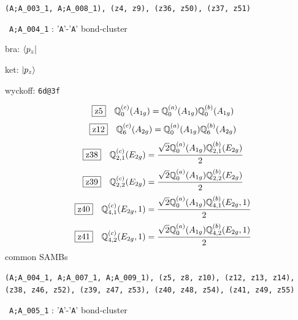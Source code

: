\documentclass[fleqn,10pt,landscape]{jsarticle}
\begin{document}
\noindent\texttt{(A;A_003_1, A;A_008_1), (z4, z9), (z36, z50), (z37, z51)}
\vspace{5mm}

\noindent\textbullet\, \texttt{A;A_004_1} : '\texttt{A}'-'\texttt{A}' bond-cluster

\noindent\quad * bra: $\bra{p_{z}}$

\noindent\quad * ket: $\ket{p_{z}}$

\noindent\quad * wyckoff: \texttt{6d@3f}

\begin{dmath*}
\hspace*{3mm}\fbox{z5}\quad \mathbb{Q}_{0}^{(c)}(A_{1g})=\mathbb{Q}_{0}^{(a)}(A_{1g}) \mathbb{Q}_{0}^{(b)}(A_{1g})
\end{dmath*}
\begin{dmath*}
\hspace*{3mm}\fbox{z12}\quad \mathbb{Q}_{6}^{(c)}(A_{2g})=\mathbb{Q}_{0}^{(a)}(A_{1g}) \mathbb{Q}_{6}^{(b)}(A_{2g})
\end{dmath*}
\begin{dmath*}
\hspace*{3mm}\fbox{z38}\quad \mathbb{Q}_{2,1}^{(c)}(E_{2g})=\frac{\sqrt{2} \mathbb{Q}_{0}^{(a)}(A_{1g}) \mathbb{Q}_{2,1}^{(b)}(E_{2g})}{2}
\end{dmath*}
\begin{dmath*}
\hspace*{3mm}\fbox{z39}\quad \mathbb{Q}_{2,2}^{(c)}(E_{2g})=\frac{\sqrt{2} \mathbb{Q}_{0}^{(a)}(A_{1g}) \mathbb{Q}_{2,2}^{(b)}(E_{2g})}{2}
\end{dmath*}
\begin{dmath*}
\hspace*{3mm}\fbox{z40}\quad \mathbb{Q}_{4,1}^{(c)}(E_{2g},1)=\frac{\sqrt{2} \mathbb{Q}_{0}^{(a)}(A_{1g}) \mathbb{Q}_{4,1}^{(b)}(E_{2g},1)}{2}
\end{dmath*}
\begin{dmath*}
\hspace*{3mm}\fbox{z41}\quad \mathbb{Q}_{4,2}^{(c)}(E_{2g},1)=\frac{\sqrt{2} \mathbb{Q}_{0}^{(a)}(A_{1g}) \mathbb{Q}_{4,2}^{(b)}(E_{2g},1)}{2}
\end{dmath*}
\noindent * common SAMBs

\noindent\texttt{(A;A_004_1, A;A_007_1, A;A_009_1), (z5, z8, z10), (z12, z13, z14), (z38, z46, z52), (z39, z47, z53), (z40, z48, z54), (z41, z49, z55)}
\vspace{5mm}

\noindent\textbullet\, \texttt{A;A_005_1} : '\texttt{A}'-'\texttt{A}' bond-cluster
\end{document}
